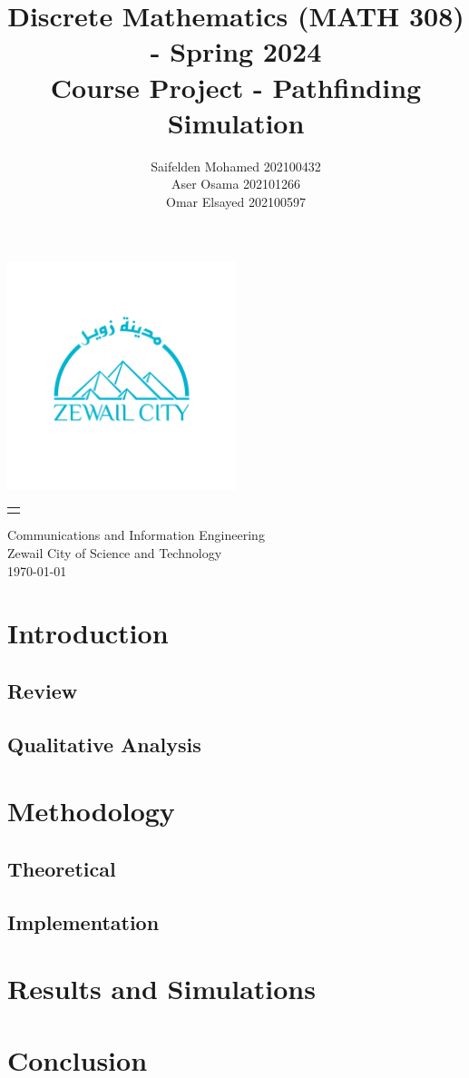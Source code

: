 \documentclass[twocolumn]{article}
\title{Discrete Mathematics (MATH 308) - Spring 2024 \\ Course Project - Pathfinding Simulation }
\author{Saifelden Mohamed 202100432\\
Aser Osama 202101266\\
Omar Elsayed 202100597\\}
\date{}
\makeatletter
\renewcommand{\maketitle}{
    \thispagestyle{empty} %
    \vspace*{\fill} %
    \begin{center}
        {\huge\@title}
        
        \vspace{1cm}
        \includegraphics[width=0.5\textwidth]{zew.png}
        
        \vspace{0.5cm}

        \Large

        \begin{tabular}{c}
            \@author
        \end{tabular}

        \vspace{0.5cm}

        
        \Large
        Communications and Information Engineering\\
        Zewail City of Science and Technology\\
        \Large
        \today
    \end{center}
    \vspace*{\fill} %
}
\makeatother
\begin{document}
\onecolumn %
\maketitle
\thispagestyle{empty} %

\newpage
\tableofcontents

\newpage
\twocolumn 

\section{Introduction}
\subsection{Review}
\subsection{Qualitative Analysis}
\section{Methodology}
\subsection{Theoretical}
\subsection{Implementation}
\section{Results and Simulations}
\section{Conclusion}
\nocite{*}


\end{document}
